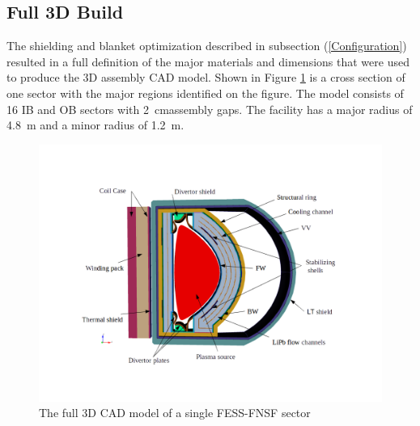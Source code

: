 \documentclass[12pt, letterpaper]{elsarticle}
\begin{document}
\subsection{Full 3D Build} \label{Full 3D Build}
The shielding and blanket optimization described in subsection (\ref{Configuration}) resulted in a full definition of the major materials and dimensions that were used to produce the 3D assembly CAD model. Shown in Figure \ref{fig:Full3D} is a cross section of one sector with the major regions identified on the figure. The model consists of 16 IB and OB sectors with \SI{2}{cm}assembly gaps. The facility has a major radius of \SI{4.8}{m} and a minor radius of \SI{1.2}{m}.
\begin{figure}[h!]
  \centering
  \includegraphics[scale=0.35]{../plots/full_3d.png}
  \caption{The full 3D CAD model of a single FESS-FNSF sector}
  \label{fig:Full3D}
\end{figure}
\end{document}
